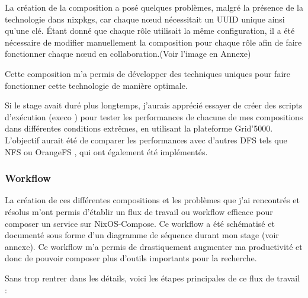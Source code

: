 \documentclass[a4paper,french,12pt, titlepage]{article}
\begin{document}
La création de la composition a posé quelques problèmes, malgré la
présence de la technologie dans nixpkgs, car chaque nœud nécessitait un
UUID unique ainsi qu'une clé. Étant donné que chaque rôle utilisait la
même configuration, il a été nécessaire de modifier manuellement la
composition pour chaque rôle afin de faire fonctionner chaque nœud en
collaboration.(Voir l'image en Annexe)\newline

Cette composition m'a permis de développer des techniques uniques pour
faire fonctionner cette technologie de manière optimale.\newline

Si le stage avait duré plus longtemps, j'aurais apprécié essayer de
créer des scripts d'exécution (execo \cite{execo2013}) pour tester les
performances de chacune de mes compositions dans différentes conditions
extrêmes, en utilisant la plateforme Grid'5000. L'objectif aurait été de
comparer les performances avec d'autres DFS tels que NFS \cite{nfs1994}
ou OrangeFS \cite{orangefs2011}, qui ont également été
implémentés.\newline

\hypertarget{workflow}{%
\subsubsection{Workflow}\label{workflow}}

La création de ces différentes compositions et les problèmes que j'ai
rencontrés et résolus m'ont permis d'établir un flux de travail ou
workflow efficace pour composer un service sur NixOS-Compose. Ce
workflow a été schématisé et documenté sous forme d'un diagramme de
séquence durant mon stage (voir annexe). Ce workflow m'a permis de
drastiquement augmenter ma productivité et donc de pouvoir composer plus
d'outils importants pour la recherche.\newline

Sans trop rentrer dans les détails, voici les étapes principales de ce
flux de travail :
\end{document}
